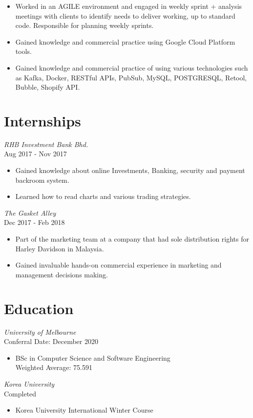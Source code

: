 \documentclass[10pt, a4paper]{cv}
\begin{document}
\begin{paracol}{2}
\begin{flushleft}
\begin{itemize}
			\item Worked in an AGILE environment and engaged in weekly sprint + analysis meetings with clients to identify needs to deliver working, up to standard code. Responsible for planning weekly sprints.
			\item Gained knowledge and commercial practice using Google Cloud Platform tools.
			\item Gained knowledge and commercial practice of using various technologies such as Kafka, Docker, RESTful APIs, PubSub, MySQL, POSTGRESQL, Retool, Bubble, Shopify API.
		\end{itemize}

		\section*{Internships}
		 {\sl RHB Investment Bank Bhd. } \\
		Aug 2017 - Nov 2017
		\begin{itemize} \itemsep -2pt
			\item Gained knowledge about online Investments, \quad Banking, security and payment backroom system.
			\item Learned how to read charts and various trading strategies.
		\end{itemize}
		{\sl The Gasket Alley } \\
		Dec 2017 - Feb 2018
		\begin{itemize} \itemsep -2pt
			\item Part of the marketing team at a company that had sole distribution rights for Harley Davidson in Malaysia.
			\item Gained invaluable hands-on commercial experience in marketing and management decisions making.
		\end{itemize}
		\vspace{24pt}

		\switchcolumn

		\section*{Education}
		 {\sl University of Melbourne} \\
		Conferral Date: December 2020
		\begin{itemize} \itemsep -1pt
			\item BSc in Computer Science and Software Engineering \\
			      Weighted Average: 75.591
		\end{itemize}
		{\sl Korea University} \\
		Completed
		\begin{itemize} \itemsep -1pt
			\item Korea University International Winter Course \\
		\end{itemize}


\end{flushleft}
\end{paracol}
\end{document}
